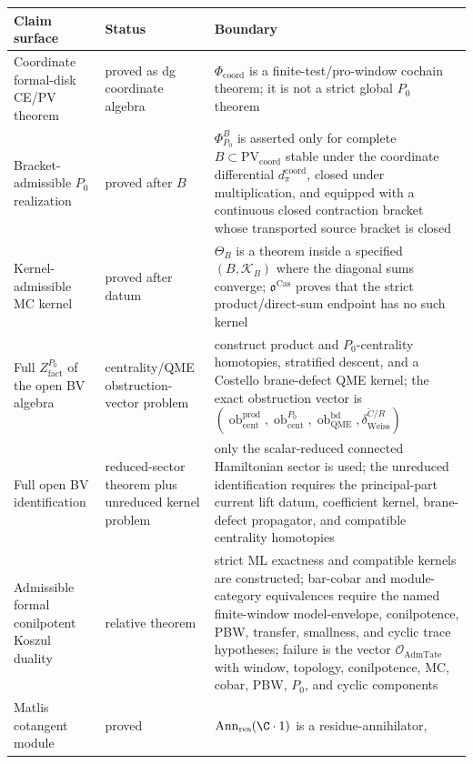 \begin{longtable}{@{}>{\raggedright\arraybackslash}p{}
  >{\raggedright\arraybackslash}p{}
  >{\raggedright\arraybackslash}p{}@{}}
\textbf{Claim surface} & \textbf{Status} & \textbf{Boundary}\\
\hline
Coordinate formal-disk CE/PV theorem & proved as dg coordinate
algebra &
\(\Phi_{\mathrm{coord}}\) is a finite-test/pro-window cochain theorem;
it is not a strict global \(P_0\) theorem\\
Bracket-admissible \(P_0\) realization & proved after \(B\) &
\(\Phi^B_{P_0}\) is asserted only for complete \(B\subset
\mathrm{PV}_{\mathrm{coord}}\) stable under the coordinate differential
\(d_\pi^{\mathrm{coord}}\), closed under
multiplication, and equipped with a continuous closed contraction bracket
whose transported source bracket is closed\\
Kernel-admissible MC kernel & proved after datum &
\(\Theta_B\) is a theorem inside a specified \((B,\mathcal K_B)\) where
the diagonal sums converge; \(\mathfrak o^{\mathrm{Cas}}\) proves that
the strict product/direct-sum endpoint has no such kernel\\
Full \(Z^{P_0}_{\mathrm{fact}}\) of the open BV algebra &
centrality/QME obstruction-vector problem &
construct product and \(P_0\)-centrality homotopies, stratified descent,
and a Costello brane-defect QME kernel; the exact obstruction vector is
\((\operatorname{ob}^{\mathrm{prod}}_{\mathrm{cent}},
\operatorname{ob}^{P_0}_{\mathrm{cent}},
\operatorname{ob}^{\mathrm{bd}}_{\mathrm{QME}},
\delta_{\mathrm{Weiss}}^{\check C/R})\)\\
Full open BV identification & reduced-sector theorem plus unreduced
kernel problem &
only the scalar-reduced connected Hamiltonian sector is used; the
unreduced identification requires the principal-part current lift datum,
coefficient kernel, brane-defect propagator, and compatible centrality
homotopies\\
Admissible formal conilpotent Koszul duality & relative theorem &
strict ML exactness and compatible kernels are constructed; bar-cobar
and module-category equivalences require the named finite-window
model-envelope, conilpotence, PBW, transfer, smallness, and cyclic trace
hypotheses; failure is the vector
\(\mathcal O_{\mathrm{AdmTate}}\) with window, topology, conilpotence,
MC, cobar, PBW, \(P_0\), and cyclic components\\
Matlis cotangent module & proved &
\(\operatorname{Ann}_{\mathrm{res}}(\C\cdot1)\) is a residue-annihilator,

\end{longtable}
